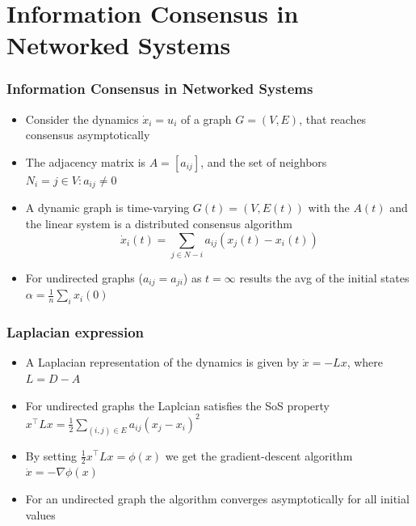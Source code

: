 \documentclass{beamer}
\begin{document}
\section{Information Consensus in Networked Systems}

\begin{frame}
\frametitle{Information Consensus in Networked Systems}
\begin{itemize}
\item Consider the dynamics $\dot{x}_i=u_i$ of a graph $G=(V,E)$, that reaches consensus asymptotically
\item The adjacency matrix is $A=[a_{ij}]$, and the set of neighbors $N_i = {j \in V : a_{ij}\ne 0}$
\item A dynamic graph is time-varying $G(t)=(V,E(t))$ with the $A(t)$ and the linear system is a distributed consensus algorithm
\begin{equation*}
\dot{x}_i(t) = \sum_{j \in N-i}a_{ij}(x_j(t)-x_i(t))
\end{equation*}
\item For undirected graphs ($a_{ij}=a_{ji}$) as $t=\infty$ results the avg of the initial states $\alpha=\frac{1}{n}\sum_i x_i(0)$
\end{itemize}
\end{frame}


\begin{frame}
\frametitle{Laplacian expression}
\begin{itemize}
\item A Laplacian representation of the dynamics is given by $\dot{x} = -Lx$, where $L=D-A$ \vspace{.2cm}
\item For undirected graphs the Laplcian satisfies the SoS property $x^{\intercal}Lx=\frac{1}{2}\sum_{(i,j)\in E}a_{ij}(x_j-x_i)^2$ \vspace{.2cm}
\item By setting $\frac{1}{2}x^{\intercal}Lx=\phi(x)$ we get the gradient-descent algorithm $\dot{x}=-\nabla \phi(x)$ \vspace{.2cm}
\item For an undirected graph the algorithm converges asymptotically for all initial values
\end{itemize}
\end{frame}

\end{document}

